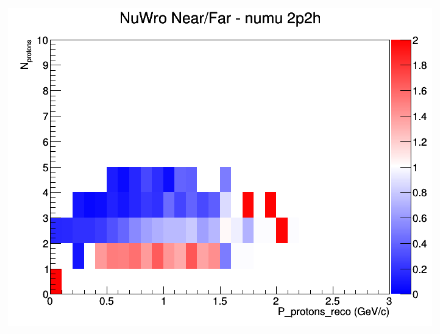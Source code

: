 \begin{figure}[h]
\endminipage
{}
\includegraphics[width=\linewidth]{eff_N_P/FGT/protons/ratios/2p2h_NuWro_numu_NF_N_P.png}
\endminipage
\newline
\end{figure}
\clearpage
